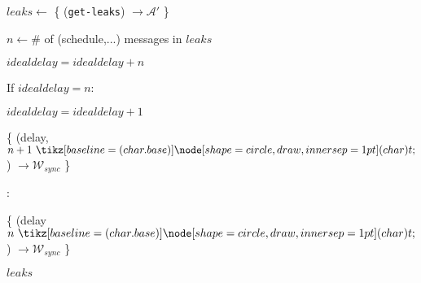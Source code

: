 \begin{bbox}[title={Algorithm $\msf{SimGetLeaks}$}]

$leaks \leftarrow$ \{ \Send (\texttt{get-leaks}) $\rightarrow \mathcal{\mathcal{A}'}$ \}

$n \leftarrow \#$ of (schedule,...) messages in $leaks$

$idealdelay = idealdelay + n$

If $idealdelay = n$:

	\quad $idealdelay = idealdelay + 1$

	\quad \{ \Send (delay, $n+1 \token$) $\rightarrow \mathcal{W}_{sync}$ \}

\Else:

	\quad \{ \Send (delay $n \token$) $\rightarrow \mathcal{W}_{sync}$ \}

\Return $leaks$

\end{bbox}


